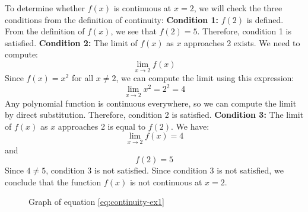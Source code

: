 \begin{answer}
    To determine whether $f(x)$ is continuous at $x=2$, we will check the three conditions from the definition of continuity:
    \newline\newline
    \textbf{Condition 1:} $f(2)$ is defined. From the definition of $f(x)$, we see that $f(2) = 5$. Therefore, condition 1 is satisfied.
    \newline\newline
    \textbf{Condition 2:} The limit of $f(x)$ as $x$ approaches 2 exists. We need to compute:
    \begin{equation*}
        \lim_{x \to 2} f(x)
    \end{equation*}
    Since $f(x) = x^2$ for all $x \neq 2$, we can compute the limit using this expression:
    \begin{equation*}
        \lim_{x \to 2} x^2 = 2^2 = 4
    \end{equation*}
    Any polynomial function is continuous everywhere, so we can compute the limit by direct substitution. 
    Therefore, condition 2 is satisfied.
    \newline\newline
    \textbf{Condition 3:} The limit of $f(x)$ as $x$ approaches 2 is equal to $f(2)$. We have:
    \begin{equation*}
        \lim_{x \to 2} f(x) = 4
    \end{equation*}
    and
    \begin{equation*}
        f(2) = 5
    \end{equation*}
    Since $4 \neq 5$, condition 3 is not satisfied.
    \newline\newline
    Since condition 3 is not satisfied, we conclude that the function $f(x)$ is not continuous at $x=2$.
    \begin{figure}[H]
    \centering
    \caption{Graph of equation \ref{eq:continuity-ex1}}
\end{figure}
\end{answer}